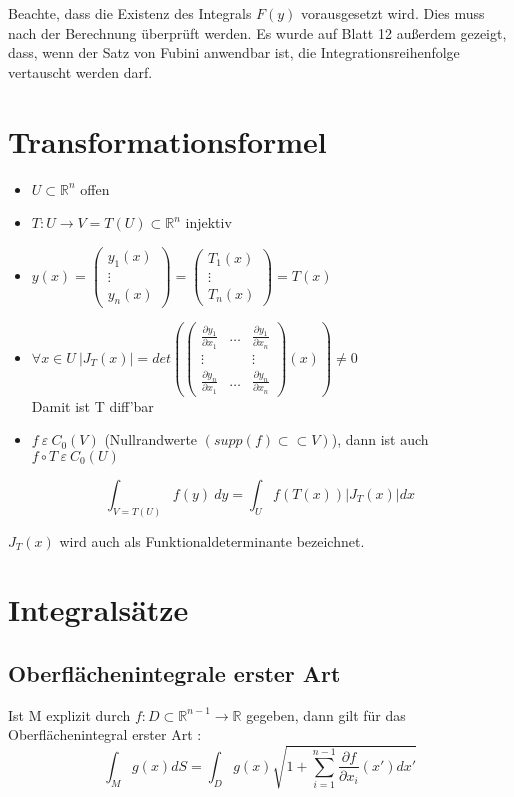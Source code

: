 Beachte, dass die Existenz des Integrals $F(y)$ vorausgesetzt wird. Dies muss nach der Berechnung überprüft werden. Es wurde auf Blatt 12 außerdem gezeigt, dass, wenn der Satz von Fubini anwendbar ist, die Integrationsreihenfolge vertauscht werden darf.

\section{Transformationsformel}
\begin{itemize}
    \item $U \subset \mathbb{R}^n$ offen
    \item $T: U\to V=T(U)\subset\mathbb{R}^n$ injektiv
    \item $y(x)= \begin{pmatrix}y_1(x)\\ \vdots \\y_n(x) \end{pmatrix} = \begin{pmatrix}T_1(x)\\ \vdots \\T_n(x) \end{pmatrix} = T(x)$
    \item $\forall x \in  U\ \vert J_T(x)\vert = det (\begin{pmatrix}\frac{\partial y_1}{\partial x_1} & \dots & \frac{\partial y_1}{\partial x_n}\\
    \vdots & & \vdots\\
    \frac{\partial y_n}{\partial x_1} & \dots & \frac{\partial y_n}{\partial x_n}
     \end{pmatrix}(x)) \neq 0$\\
     Damit ist T diff'bar
     \item $ f \ \varepsilon \ C_0(V)$ (Nullrandwerte $(supp(f)\subset\subset V)$), dann ist auch $f \circ T \ \varepsilon \ C_0(U)$
\end{itemize}

\begin{equation}
    \int_{V=T(U)} f(y) \ dy = \int_U f(T(x)) |J_T(x)| dx
\end{equation}

$J_T(x)$ wird auch als Funktionaldeterminante bezeichnet.

\section{Integralsätze}
\subsection{Oberflächenintegrale erster Art}
Ist M explizit durch $f: D \subset \mathbb{R}^{n-1} \rightarrow \mathbb{R}$ gegeben, dann gilt für das Oberflächenintegral erster Art : \\
\begin{equation}
    \int_M g(x)dS = \int_D g(x) \sqrt{1+\sum_{i=1}^{n-1} \frac{\partial f}{\partial x_i}(x')dx'}
\end{equation}

